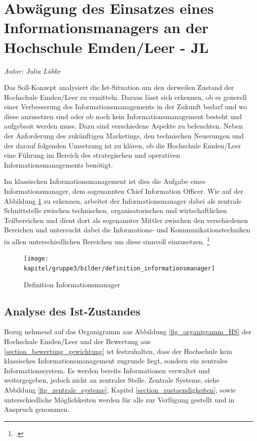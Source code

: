\section{Abwägung des Einsatzes eines Informationsmanagers an der Hochschule Emden/Leer - JL}
\label{section_einsatz_cio}
\textit{Autor: Julia Lübke}

Das Soll-Konzept analysiert die Ist-Situation um den derweilen Zustand der  Hochschule Emden/Leer zu ermitteln. Daraus lässt sich erkennen, ob es generell einer Verbesserung des Informationsmanagements in der Zukunft bedarf und wo diese anzusetzen sind oder ob noch kein Informationsmanagement besteht und aufgebaut werden muss. Dazu sind verschiedene Aspekte zu beleuchten. Neben der Anforderung des zukünftigen Marketings, den technischen Neuerungen und der darauf folgenden Umsetzung ist zu klären, ob die Hochschule Emden/Leer eine Führung im Bereich des strategischen und operativen Informationsmanagements benötigt.

Im klassischen Informationsmanagement ist dies die Aufgabe eines Informationsmanager, dem sogenannten Chief Information Officer. Wie auf der Abbildung \ref{fig_def_inm} zu erkennen, arbeitet der Informationsmanager dabei als zentrale Schnittstelle zwischen technischen, organisatorischen und wirtschaftlichen Teilbereichen und dient dort als sogenannter Mittler zwischen den verschiedenen Bereichen und untersucht dabei die Informations- und Kommunikationstechniken in allen unterschiedlichen Bereichen um diese sinnvoll einzusetzen. 
\footcite[86]{definition_informationsmanager}

\begin{figure}[h!]
	\centering
	\texttt{[image: kapitel/gruppe3/bilder/definition\_informationsmanager]}
	\caption{Definition Informationsmanager}
	\label{fig_def_inm}
\end{figure}

\subsection{Analyse des Ist-Zustandes}
\label{subsection_analyse_ist_zustand}

Bezug nehmend auf das Organigramm aus Abbildung \ref{fig_organigramm_HS} der Hochschule Emden/Leer und der Bewertung aus  \ref{section_bewertung_gewichtung} ist festzuhalten, dass der Hochschule kein klassisches Informationsmanagement zugrunde liegt, sondern ein zentrales Informationssystem. Es werden bereits Informationen verwaltet und weitergegeben, jedoch nicht an zentraler Stelle. Zentrale Systeme, siehe Abbildung \ref{fig_zentrale_systeme}, Kapitel \ref{section_zustaendigkeiten}, sowie unterschiedliche Möglichkeiten werden für alle zur Verfügung gestellt und in Anspruch genommen. 

